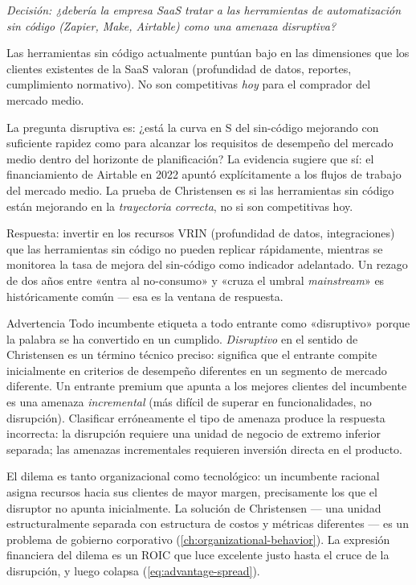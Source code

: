 \begin{example}
\emph{Decisión: ¿debería la empresa SaaS tratar a las herramientas de automatización sin
código (Zapier, Make, Airtable) como una amenaza disruptiva?}

Las herramientas sin código actualmente puntúan bajo en las dimensiones que los clientes
existentes de la SaaS valoran (profundidad de datos, reportes, cumplimiento normativo). No
son competitivas \emph{hoy} para el comprador del mercado medio.

La pregunta disruptiva es: ¿está la curva en S del sin-código mejorando con suficiente rapidez
como para alcanzar los requisitos de desempeño del mercado medio dentro del horizonte de
planificación? La evidencia sugiere que sí: el financiamiento de Airtable en 2022 apuntó
explícitamente a los flujos de trabajo del mercado medio. La prueba de Christensen es si las
herramientas sin código están mejorando en la \emph{trayectoria correcta}, no si son
competitivas hoy.

Respuesta: invertir en los recursos VRIN (profundidad de datos, integraciones) que las
herramientas sin código no pueden replicar rápidamente, mientras se monitorea la tasa de
mejora del sin-código como indicador adelantado. Un rezago de dos años entre «entra al
no-consumo» y «cruza el umbral \emph{mainstream}» es históricamente común --- esa es la
ventana de respuesta.
\end{example}

\begin{admonition}{Advertencia}
Todo incumbente etiqueta a todo entrante como «disruptivo» porque la palabra se ha convertido
en un cumplido. \emph{Disruptivo} en el sentido de Christensen es un término técnico preciso:
significa que el entrante compite inicialmente en criterios de desempeño diferentes en un
segmento de mercado diferente. Un entrante premium que apunta a los mejores clientes del
incumbente es una amenaza \emph{incremental} (más difícil de superar en funcionalidades, no
disrupción). Clasificar erróneamente el tipo de amenaza produce la respuesta incorrecta: la
disrupción requiere una unidad de negocio de extremo inferior separada; las amenazas
incrementales requieren inversión directa en el producto.
\end{admonition}

El dilema es tanto organizacional como tecnológico: un incumbente racional asigna recursos
hacia sus clientes de mayor margen, precisamente los que el disruptor no apunta inicialmente.
La solución de Christensen --- una unidad estructuralmente separada con estructura de costos y
métricas diferentes --- es un problema de gobierno corporativo (\cref{ch:organizational-behavior}).
La expresión financiera del dilema es un ROIC que luce excelente justo hasta el cruce de la
disrupción, y luego colapsa (\cref{eq:advantage-spread}).

